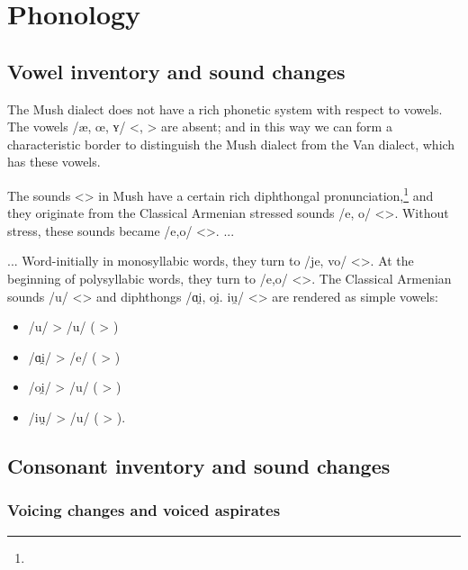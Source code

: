 \section{Phonology}
\subsection{Vowel inventory and sound changes}

The Mush dialect does not have a rich phonetic system with respect to vowels. The vowels /æ, œ, ʏ/ <, > are absent; and in this way we can form a characteristic border to distinguish the Mush dialect from the Van dialect, which has these vowels. 

The sounds <> in Mush have a certain rich diphthongal pronunciation,\footnote{} and they originate from the Classical Armenian stressed sounds /e, o/ <>. Without stress, these sounds became /e,o/ <>. ... 


\begin{adjarianpage}\label{page:117}\end{adjarianpage}%

... Word-initially in monosyllabic words, they turn to /je, vo/ <>. At the beginning of polysyllabic words, they turn to /e,o/ <>. The Classical Armenian sounds /u/ <> and diphthongs /ɑi̯, oi̯. iu̯/ <> are rendered as simple vowels:

\begin{itemize}
	\item /u/ > /u/ ( > ) 
	\item /ɑi̯/ > /e/ ( > )
	\item /oi̯/ > /u/ ( > )
	\item /iu̯/ > /u/ ( > ). 
\end{itemize}


\subsection{Consonant inventory and sound changes}

\subsubsection{Voicing changes and voiced aspirates}


